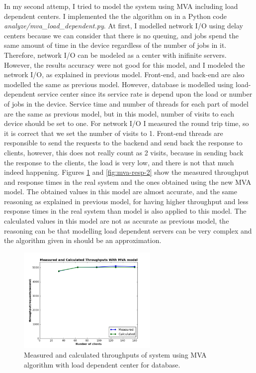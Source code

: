 \documentclass[11pt]{article}
\begin{document}
In my second attemp, I tried to model the system using MVA including load dependent centers. I implemented the the algorithm on 
\cite[section~36.1]{book} in a Python code \emph{analyze/mva\_load\_dependent.py}. At first, I modelled network 
I/O using delay centers because we can consider that there is no queuing, and jobs spend the same
amount of time in the device regardless of the number of jobs in it. Therefore, network I/O can be modeled as 
a center with inifinite servers. However, the results accuracy were not good for this model, and I modeled the network 
I/O, as explained in previous model. Front-end, and back-end are also modelled the same as previous model.
However, database is modelled using load-dependent service
center since its service rate is depend upon the load or number of jobs in the device. Service time and number of 
threads for each part of model are the same as previous model, but in this model, number of visits to each device should be 
set to one. For network I/O I measured the round trip time, so it is correct that we set the number 
of visits to 1. Front-end threads are responsible to send the requests to the backend and send back the response to 
clients, however, this does not really count as 2 visits, because in sending back the response to the clients,
the load is very low, and there is not that much indeed happening. Figures \ref{fig:mva-thr-2} and \ref{fig:mva-resp-2} show
the measured throughput and response times in the real system and the ones obtained using the new MVA model.
The obtained values in this model are almost accurate, and the same reasoning as explained in previous model, for having higher 
throughput and less response times in the real system than model is also applied to this model. 
The calculated values in this model are not as accurate as previous model, the reasoning
can be that modelling load dependent servers can be very complex and the algorithm given in \cite[section~36.1]{book}
should be an approximation.

\begin{figure}[H]
  \includegraphics[width=0.6\textwidth,page=1]{figures/mva-load-dependent/throughput}
  \centering
  \caption{Measured and calculated throughputs of system using MVA algorithm with load dependent center for database.}
  \label{fig:mva-thr-2}
\end{figure}
\end{document}
